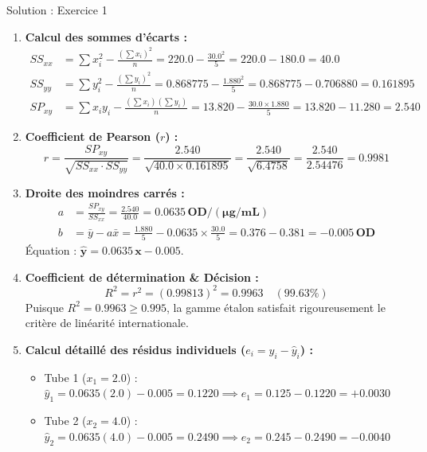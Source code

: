 \documentclass[11pt,a4paper]{article}
\begin{document}
\begin{solutionbox}{Solution : Exercice 1}
\begin{enumerate}[label=\textbf{\alph*.}]
  \item \textbf{Calcul des sommes d'écarts :}
  \begin{align*}
    SS_{xx} &= \sum x_i^2 - \frac{(\sum x_i)^2}{n} = 220.0 - \frac{30.0^2}{5} = 220.0 - 180.0 = \mathbf{40.0} \\
    SS_{yy} &= \sum y_i^2 - \frac{(\sum y_i)^2}{n} = 0.868775 - \frac{1.880^2}{5} = 0.868775 - 0.706880 = \mathbf{0.161895} \\
    SP_{xy} &= \sum x_i y_i - \frac{(\sum x_i)(\sum y_i)}{n} = 13.820 - \frac{30.0 \times 1.880}{5} = 13.820 - 11.280 = \mathbf{2.540}
  \end{align*}
  \item \textbf{Coefficient de Pearson ($r$) :}
  \begin{equation*}
    r = \frac{SP_{xy}}{\sqrt{SS_{xx} \cdot SS_{yy}}} = \frac{2.540}{\sqrt{40.0 \times 0.161895}} = \frac{2.540}{\sqrt{6.4758}} = \frac{2.540}{2.54476} = \mathbf{0.9981}
  \end{equation*}
  \item \textbf{Droite des moindres carrés :}
  \begin{align*}
    a &= \frac{SP_{xy}}{SS_{xx}} = \frac{2.540}{40.0} = \mathbf{0.0635\,\text{OD}/(\mu\text{g/mL})} \\
    b &= \bar{y} - a \bar{x} = \frac{1.880}{5} - 0.0635 \times \frac{30.0}{5} = 0.376 - 0.381 = \mathbf{-0.005\,\text{OD}}
  \end{align*}
  Équation : $\mathbf{\hat{y} = 0.0635\,x - 0.005}$.
  \item \textbf{Coefficient de détermination \& Décision :}
  \begin{equation*}
    R^2 = r^2 = (0.99813)^2 = \mathbf{0.9963} \quad (99.63\%)
  \end{equation*}
  Puisque $R^2 = 0.9963 \ge 0.995$, la gamme étalon satisfait rigoureusement le critère de linéarité internationale.
  \item \textbf{Calcul détaillé des résidus individuels ($e_i = y_i - \hat{y}_i$) :}
  \begin{itemize}[leftmargin=*, label=\faAngleRight]
    \item Tube 1 ($x_1=2.0$) : $\hat{y}_1 = 0.0635(2.0) - 0.005 = 0.1220 \implies e_1 = 0.125 - 0.1220 = \mathbf{+0.0030}$
    \item Tube 2 ($x_2=4.0$) : $\hat{y}_2 = 0.0635(4.0) - 0.005 = 0.2490 \implies e_2 = 0.245 - 0.2490 = \mathbf{-0.0040}$

\end{itemize}
\end{enumerate}
\end{solutionbox}
\end{document}
